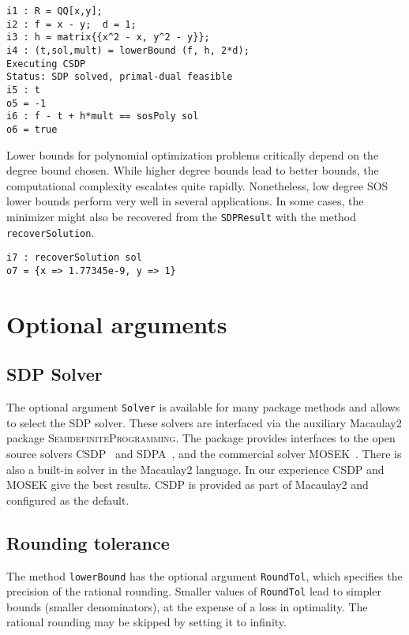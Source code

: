 \documentclass[11pt]{amsart}
\theoremstyle{plain}%
\theoremstyle{definition}
\theoremstyle{remark}
\newcommand{\Mac}{Macaulay2\xspace}
\newcommand{\SDP}{\textsc{SemidefiniteProgramming}\xspace}
\begin{document}
{\small
\begin{verbatim}
i1 : R = QQ[x,y];
i2 : f = x - y;  d = 1;
i3 : h = matrix{{x^2 - x, y^2 - y}};
i4 : (t,sol,mult) = lowerBound (f, h, 2*d);
Executing CSDP
Status: SDP solved, primal-dual feasible
i5 : t
o5 = -1
i6 : f - t + h*mult == sosPoly sol
o6 = true
\end{verbatim}
}

Lower bounds for polynomial optimization problems critically depend on the degree bound chosen.
While higher degree bounds lead to better bounds, the computational complexity escalates quite rapidly.
Nonetheless, low degree SOS lower bounds perform very well in several applications.
In some cases, the minimizer might also be recovered from the \verb|SDPResult| with the method \verb|recoverSolution|.

{\small
\begin{verbatim}
i7 : recoverSolution sol
o7 = {x => 1.77345e-9, y => 1}
\end{verbatim}
}

\section{Optional arguments}
\label{s:arguments}

\subsection*{SDP Solver}
The optional argument \verb|Solver| is available for many package methods and allows to select the SDP solver.
These solvers are interfaced via the auxiliary Macaulay2 package \SDP.
The package provides interfaces to the open source solvers CSDP~\cite{borchers1999csdp} and SDPA~\cite{yamashita2003implementation}, and the commercial solver MOSEK~\cite{mosek}.
There is also a built-in solver in the \Mac language.
In our experience CSDP and MOSEK give the best results.
CSDP is provided as part of \Mac and configured as the default.

\subsection*{Rounding tolerance}
The method \verb|lowerBound| has the optional argument \verb|RoundTol|, which specifies the precision of the rational rounding.
Smaller values of \verb|RoundTol| lead to simpler bounds (smaller denominators), at the expense of a loss in optimality.
The rational rounding may be skipped by setting it to infinity.
\end{document}
